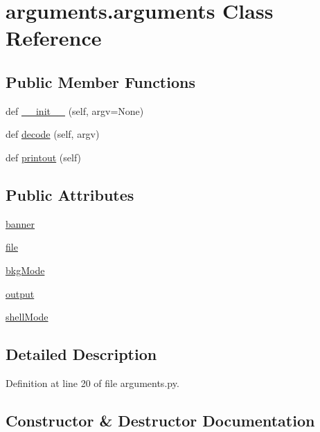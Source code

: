 \hypertarget{classarguments_1_1arguments}{}\section{arguments.\+arguments Class Reference}
\label{classarguments_1_1arguments}
\subsection*{Public Member Functions}
\begin{DoxyCompactItemize}
\item 
def \hyperlink{classarguments_1_1arguments_a96d8df876c5b1c1fa7fa2060d2040b93}{\+\_\+\+\_\+init\+\_\+\+\_\+} (self, argv=None)
\item 
def \hyperlink{classarguments_1_1arguments_a05c504158f7fdfeb8824820da75d6f4e}{decode} (self, argv)
\item 
def \hyperlink{classarguments_1_1arguments_a772086f564c9ebb8e2955439c4d3dff1}{printout} (self)
\end{DoxyCompactItemize}
\subsection*{Public Attributes}
\begin{DoxyCompactItemize}
\item 
\hyperlink{classarguments_1_1arguments_acb4e4112cd5350ff6a02489afe2ff105}{banner}
\item 
\hyperlink{classarguments_1_1arguments_a95bc3c2f1cb1beb822d776e202131b4f}{file}
\item 
\hyperlink{classarguments_1_1arguments_a0682389c6c09efe728929cb9e32fb329}{bkg\+Mode}
\item 
\hyperlink{classarguments_1_1arguments_aa3da800e3d6dbadd4cfa43fea9ad8d78}{output}
\item 
\hyperlink{classarguments_1_1arguments_a7eb3f133bfc7a375dd8c8dd6294504b6}{shell\+Mode}
\end{DoxyCompactItemize}


\subsection{Detailed Description}


Definition at line 20 of file arguments.\+py.



\subsection{Constructor \& Destructor Documentation}
\mbox{\label{classarguments_1_1arguments_a96d8df876c5b1c1fa7fa2060d2040b93}} 
